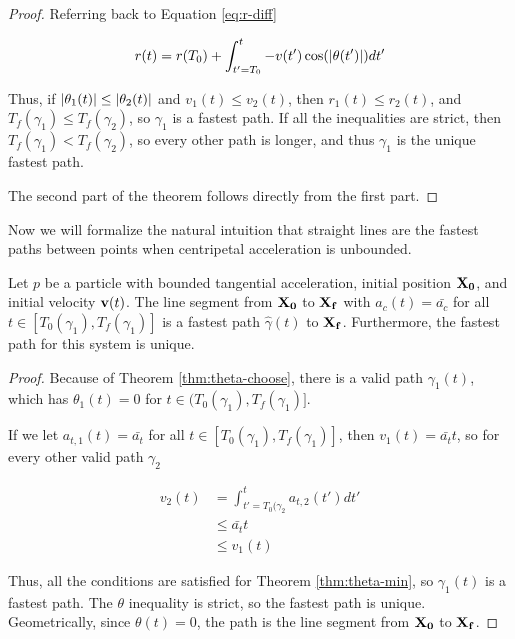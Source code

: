 \begin{proof}
  Referring back to Equation \ref{eq:r-diff}

  \[r(t) = r(T_0) + \int_{t' = T_0}^{t} - v(t') \cos(\abs{\theta(t')}) dt'\]

  Thus, if $\abs{\theta_1(t)} \le \abs{\theta_2(t)}$ and $v_1(t) \le v_2(t)$, then $r_1(t) \le r_2(t)$, and $T_f(\gamma_1) \le T_f(\gamma_2)$, so $\gamma_1$ is a fastest path. If all the inequalities are strict, then $T_f(\gamma_1) < T_f(\gamma_2)$, so every other path is longer, and thus $\gamma_1$ is the unique fastest path.

  The second part of the theorem follows directly from the first part.
\end{proof}

Now we will formalize the natural intuition that straight lines are the fastest paths between points when centripetal acceleration is unbounded.

\begin{theorem}\label{thm:line-proof}
  Let $p$ be a particle with bounded tangential acceleration, initial position $\mathbf{X_0}$, and initial velocity $\mathbf{v}(t)$. The line segment from $\mathbf{X_0}$ to $\mathbf{X_f}$ with $a_c(t) = \bar{a_c}$ for all $t \in [T_0(\gamma_1), T_f(\gamma_1)]$ is a fastest path $\hat{\gamma}(t)$ to $\mathbf{X_f}$. Furthermore, the fastest path for this system is unique.
\end{theorem}

\begin{proof}
  Because of Theorem \ref{thm:theta-choose}, there is a valid path $\gamma_1(t)$, which has $\theta_1(t) = 0$ for $t \in (T_0(\gamma_1), T_f(\gamma_1)]$.

  If we let $a_{t, 1}(t) = \bar{a_t}$ for all $t \in [T_0(\gamma_1), T_f(\gamma_1)]$, then $v_1(t) = \bar{a_t} t$, so for every other valid path $\gamma_2$

  \begin{align*}
    v_2(t)& = \int_{t'=T_0(\gamma_2}^{t} a_{t, 2}(t') dt'\\
    & \le \bar{a_t} t\\
    &  \le v_1(t)
  \end{align*}

  Thus, all the conditions are satisfied for Theorem \ref{thm:theta-min}, so $\gamma_1(t)$ is a fastest path. The $\theta$ inequality is strict, so the fastest path is unique. Geometrically, since $\theta(t) = 0$, the path is the line segment from $\mathbf{X_0}$ to $\mathbf{X_f}$.
\end{proof}

